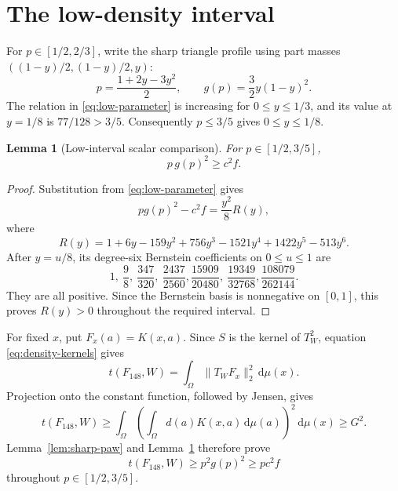 \documentclass[11pt]{article}
\newtheorem{lemma}[theorem]{Lemma}
\newcommand{\dd}{\,\mathrm d}
\begin{document}
\section{The low-density interval}

For $p\in[1/2,2/3]$, write the sharp triangle profile using part masses
$( (1-y)/2,(1-y)/2,y )$:
\begin{equation}
 p=\frac{1+2y-3y^2}{2},\qquad
 g(p)=\frac32y(1-y)^2.
 \label{eq:low-parameter}
\end{equation}
The relation in \eqref{eq:low-parameter} is increasing for
$0\leq y\leq1/3$, and its value at $y=1/8$ is $77/128>3/5$.
Consequently $p\leq3/5$ gives $0\leq y\leq1/8$.

\begin{lemma}[Low-interval scalar comparison]
\label{lem:low-scalar}
For $p\in[1/2,3/5]$,
\[
 p\,g(p)^2\geq c^2f.
\]
\end{lemma}

\begin{proof}
Substitution from \eqref{eq:low-parameter} gives
\[
 p g(p)^2-c^2f=\frac{y^2}{8}R(y),
\]
where
\[
 R(y)=1+6y-159y^2+756y^3-1521y^4+1422y^5-513y^6.
\]
After $y=u/8$, its degree-six Bernstein coefficients on $0\leq u\leq1$
are
\[
 1,\ \frac98,\ \frac{347}{320},\ \frac{2437}{2560},
 \frac{15909}{20480},\ \frac{19349}{32768},
 \frac{108079}{262144}.
\]
They are all positive.
Since the Bernstein basis is nonnegative on $[0,1]$, this proves
$R(y)>0$ throughout the required interval.
\end{proof}

For fixed $x$, put $F_x(a)=K(x,a)$.  Since $S$ is the kernel of
$T_W^2$, equation \eqref{eq:density-kernels} gives
\begin{equation}
 t(F_{148},W)=\int_\Omega\lVert T_WF_x\rVert_2^2\dd\mu(x).
 \label{eq:hilbert-density}
\end{equation}
Projection onto the constant function, followed by Jensen, gives
\begin{equation}
 t(F_{148},W)
 \geq\int_\Omega
 \left(\int_\Omega d(a)K(x,a)\dd\mu(a)\right)^2\dd\mu(x)
 \geq G^2.
 \label{eq:paw-square}
\end{equation}
Lemma~\ref{lem:sharp-paw} and Lemma~\ref{lem:low-scalar} therefore prove
\[
 t(F_{148},W)\geq p^2g(p)^2\geq pc^2f
\]
throughout $p\in[1/2,3/5]$.


\end{document}
